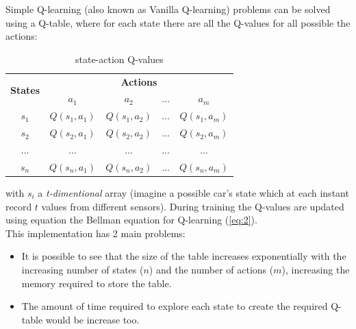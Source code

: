 \documentclass[14pt]{extarticle}
\def\ppn{\vspace{10pt}}
\begin{document}
\begin{flushleft}
\ppn
Simple Q-learning (also known as Vanilla Q-learning) problems can be solved using a Q-table, where for each state there are all the Q-values for all possible the actions:

\begin{table}[H]
\centering
\begin{tabular}{|c|c|c|c|c|}
\hline
\multirow{2}{*}{\textbf{States}} & \multicolumn{4}{c|}{\textbf{Actions}}                                \\ \cline{2-5} 
                                 & \textbf{$a_1$} & \textbf{$a_2$} & \textbf{$\dotso$} & \textbf{$a_m$} \\ \hline
$s_1$  				& $Q(s_1,a_1)$   				& $Q(s_1,a_2)$  				&  $\dotso$  				& $Q(s_1,a_m)$                \\ \hline
$s_2$  				& $Q(s_2,a_1)$   				& $Q(s_2,a_2)$  				&  $\dotso$  				& $Q(s_2,a_m)$                \\ \hline
$\dotso$      &  $\dotso$              	& $\dotso$              	&  $\dotso$              & $\dotso$              \\ \hline
$s_n$  				& $Q(s_n,a_1)$   				& $Q(s_n,a_2)$  				&  $\dotso$  				& $Q(s_n,a_m)$                \\ \hline
\end{tabular}
\caption{state-action Q-values}
\label{tab:my-table}
\end{table}
with $s_i$ a \emph{t-dimentional} array (imagine a possible car's state which at each instant record $t$ values from different sensors).
During training the Q-values are updated using equation the Bellman equation for Q-learning (\ref{eq:2}).
\\
This implementation has 2 main problems:
\begin{itemize}
\item It is possible to see that the size of the table increases exponentially with the increasing number of states ($n$) and the number of actions ($m$), increasing the memory required to store the table.
\item The amount of time required to explore each state to create the required Q-table would be increase too.
\end{itemize}


\end{flushleft}
\end{document}
